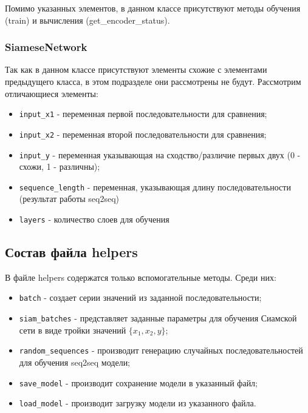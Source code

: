 Помимо указанных элементов, в данном классе присутствуют методы обучения (train) и вычисления (get\_encoder\_status).

\subsubsection{SiameseNetwork}

Так как в данном классе присутствуют элементы схожие с элементами предыдущего класса, в этом подразделе они рассмотрены не будут. Рассмотрим отличающиеся элементы:

\begin{itemize}
\setlength\itemsep{0mm}
\item \texttt{input\_x1} - переменная первой последовательности для сравнения;
\item \texttt{input\_x2} - переменная второй последовательности для сравнения;
\item \texttt{input\_y} - переменная указывающая на сходство/различие первых двух (0 - схожи, 1 - различны);
\item \texttt{sequence\_length} - переменная, указывающая длину последовательности (результат работы seq2seq)
\item \texttt{layers} - количество слоев для обучения
\end{itemize}

\subsection{Состав файла helpers}

В файле helpers содержатся только вспомогательные методы. Среди них:

\begin{itemize}
\setlength\itemsep{0mm}
\item \texttt{batch} - создает серии значений из заданной последовательности;
\item \texttt{siam\_batches} - представляет заданные параметры для обучения Сиамской сети в виде тройки значений \(\{x_1, x_2, y\}\);
\item \texttt{random\_sequences} - производит генерацию случайных последовательностей для обучения seq2seq модели;
\item \texttt{save\_model} - производит сохранение модели в указанный файл;
\item \texttt{load\_model} - производит загрузку модели из указанного файла.
\end{itemize}

